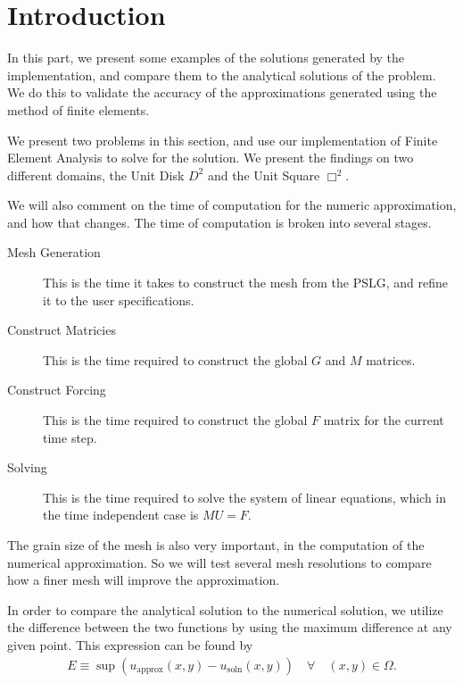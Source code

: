 \documentclass[../fem.tex]{subfile}
\begin{document}
\section{Introduction}%
\label{sec:introduction_4}

In this part, we present some examples of the solutions generated by the
implementation, and compare them to the analytical solutions of the problem. We
do this to validate the accuracy of the approximations generated using the
method of finite elements.

We present two problems in this section, and use our implementation of Finite
Element Analysis to solve for the solution. We present the findings on two
different domains, the Unit Disk $D^2$ and the Unit Square $\Box^2$.

We will also comment on the time of computation for the numeric approximation,
and how that changes. The time of computation is broken into several stages.
\begin{description}
  \item[Mesh Generation] This is the time it takes to construct the mesh from
    the PSLG, and refine it to the user specifications.
  \item[Construct Matricies] This is the time required to construct the global
    $G$ and $M$ matrices.
  \item[Construct Forcing] This is the time required to construct the global
    $F$ matrix for the current time step.
  \item[Solving] This is the time required to solve the system of linear
    equations, which in the time independent case is $MU=F$.
\end{description}

The grain size of the mesh is also very important, in the computation of the
numerical approximation. So we will test several mesh resolutions to compare
how a finer mesh will improve the approximation.

In order to compare the analytical solution to the numerical solution, we
utilize the difference between the two functions by using the maximum
difference at any given point. This expression can be found by
\begin{align*}
  E\equiv\sup\left(u_\text{approx}(x,y)-u_\text{soln}(x,y)\right)\quad\forall\quad
    (x,y)\in\Omega.
\end{align*}
\end{document}
